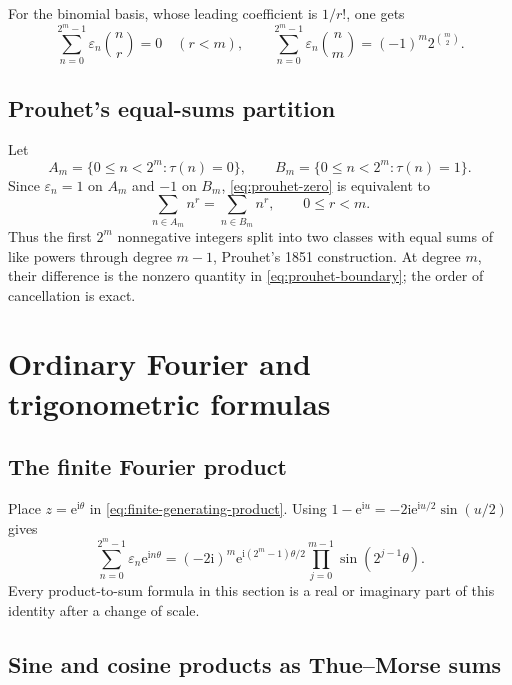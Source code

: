 \documentclass[11pt,oneside]{article}
\theoremstyle{definition}
\theoremstyle{remark}
\newcommand{\e}{\mathrm e}
\newcommand{\ii}{\mathrm i}
\newcommand{\eps}{\varepsilon}
\begin{document}
For the binomial basis, whose leading coefficient is \(1/r!\), one gets
\begin{equation}
  \sum_{n=0}^{2^m-1}\eps_n\binom nr=0\quad(r<m),
  \qquad
  \sum_{n=0}^{2^m-1}\eps_n\binom nm=(-1)^m2^{\binom m2}.
  \label{eq:binomial-moments}
\end{equation}

\subsection{Prouhet's equal-sums partition}

Let
\[
  A_m=\{0\le n<2^m:\tau(n)=0\},
  \qquad
  B_m=\{0\le n<2^m:\tau(n)=1\}.
\]
Since \(\eps_n=1\) on \(A_m\) and \(-1\) on \(B_m\),
\eqref{eq:prouhet-zero} is equivalent to
\begin{equation}
  \sum_{n\in A_m}n^r=\sum_{n\in B_m}n^r,
  \qquad 0\le r<m.
  \label{eq:prouhet-partition}
\end{equation}
Thus the first \(2^m\) nonnegative integers split into two classes with equal
sums of like powers through degree \(m-1\), Prouhet's 1851 construction.  At
degree \(m\), their difference is the nonzero quantity in
\eqref{eq:prouhet-boundary}; the order of cancellation is exact.

\section{Ordinary Fourier and trigonometric formulas}
\label{sec:fourier}

\subsection{The finite Fourier product}

Place \(z=\e^{\ii\theta}\) in
\eqref{eq:finite-generating-product}.  Using
\(1-\e^{\ii u}=-2\ii\e^{\ii u/2}\sin(u/2)\) gives
\begin{equation}
  \boxed{
  \sum_{n=0}^{2^m-1}\eps_n\e^{\ii n\theta}
  =(-2\ii)^m
   \e^{\ii(2^m-1)\theta/2}
   \prod_{j=0}^{m-1}\sin(2^{j-1}\theta).}
  \label{eq:finite-Fourier-product}
\end{equation}
Every product-to-sum formula in this section is a real or imaginary part of
this identity after a change of scale.

\subsection{Sine and cosine products as Thue--Morse sums}
\label{sec:trig-products}
\end{document}

